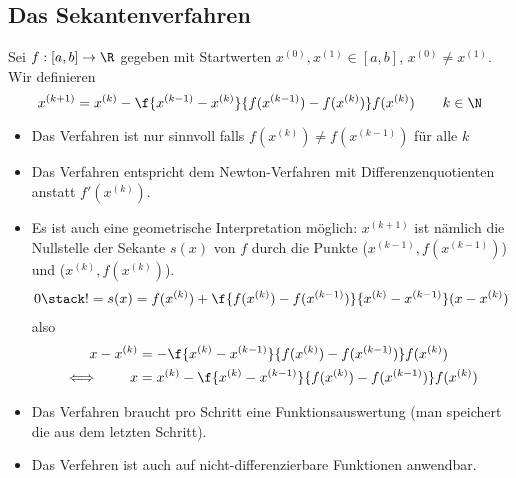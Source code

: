 \documentclass[11pt]{scrbook}
\begin{document}
\subsection{Das Sekantenverfahren}

\begin{df}[Sekantenverfahren] \label{3.5}
	Sei $f:[a,b] \to \R$ gegeben mit Startwerten $x^{(0)}, x^{(1)} \in [a,b]$, $x^{(0)} \neq x^{(1)}$.
	Wir definieren
	\[
		x^{(k+1)} = x^{(k)} - \f {x^{(k-1)} - x^{(k)}}{f(x^{(k-1)}) - f(x^{(k)})} f(x^{(k)})
		\qquad k\in \N
	\]
	\begin{note}
		\begin{itemize}
			\item
				Das Verfahren ist nur sinnvoll falls $f(x^{(k)}) \neq f(x^{(k-1)})$ für alle $k$
			\item
				Das Verfahren entspricht dem Newton-Verfahren mit Differenzenquotienten anstatt $f'(x^{(k)})$.
			\item
				Es ist auch eine geometrische Interpretation möglich:
				$x^{(k+1)}$ ist nämlich die Nullstelle der Sekante $s(x)$ von $f$ durch die Punkte ($x^{(k-1)}, f(x^{(k-1)})$) und ($x^{(k)},f(x^{(k)})$).
				\begin{align*}
					0 \stack != s(x) = f(x^{(k)}) + \f {f(x^{(k)})-f(x^{(k-1)})}{x^{(k)}-x^{(k-1)}} (x-x^{(k)})
				\end{align*}
				also
				\begin{align*}
					x-x^{(k)} &= - \f {x^{(k)}-x^{(k-1)}}{f(x^{(k)}) - f(x^{(k-1)})} f(x^{(k)}) \\
					\iff \qquad
					x &= x^{(k)} - \f {x^{(k)}-x^{(k-1)}}{f(x^{(k)}) - f(x^{(k-1)})} f(x^{(k)})
				\end{align*}
			\item
				Das Verfahren braucht pro Schritt eine Funktionsauswertung (man speichert die aus dem letzten Schritt).
			\item
				Das Verfehren ist auch auf nicht-differenzierbare Funktionen anwendbar.
		\end{itemize}
	\end{note}
\end{df}
\end{document}
